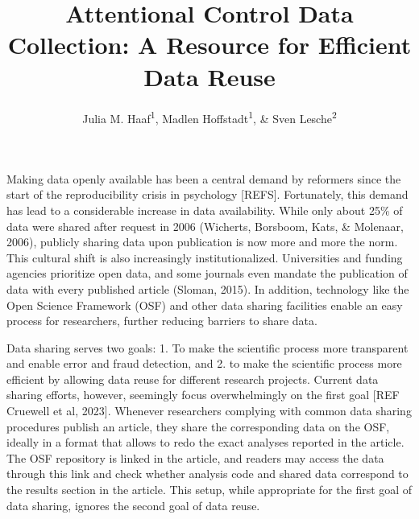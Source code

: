 \documentclass[
  man,floatsintext]{apa6}
\title{Attentional Control Data Collection: A Resource for Efficient Data Reuse}
\author{Julia M. Haaf\textsuperscript{1}, Madlen Hoffstadt\textsuperscript{1}, \& Sven Lesche\textsuperscript{2}}
\date{}
\affiliation{\vspace{0.5cm}\textsuperscript{1} University of Amsterdam\\\textsuperscript{2} University of Heidelberg}
\begin{document}
\maketitle

Making data openly available has been a central demand by reformers since the start of the reproducibility crisis in psychology {[}REFS{]}. Fortunately, this demand has lead to a considerable increase in data availability. While only about 25\% of data were shared after request in 2006 (Wicherts, Borsboom, Kats, \& Molenaar, 2006), publicly sharing data upon publication is now more and more the norm. This cultural shift is also increasingly institutionalized. Universities and funding agencies prioritize open data, and some journals even mandate the publication of data with every published article (Sloman, 2015). In addition, technology like the Open Science Framework (OSF) and other data sharing facilities enable an easy process for researchers, further reducing barriers to share data.

Data sharing serves two goals: 1. To make the scientific process more transparent and enable error and fraud detection, and 2. to make the scientific process more efficient by allowing data reuse for different research projects. Current data sharing efforts, however, seemingly focus overwhelmingly on the first goal {[}REF Cruewell et al, 2023{]}. Whenever researchers complying with common data sharing procedures publish an article, they share the corresponding data on the OSF, ideally in a format that allows to redo the exact analyses reported in the article. The OSF repository is linked in the article, and readers may access the data through this link and check whether analysis code and shared data correspond to the results section in the article. This setup, while appropriate for the first goal of data sharing, ignores the second goal of data reuse.
\end{document}
